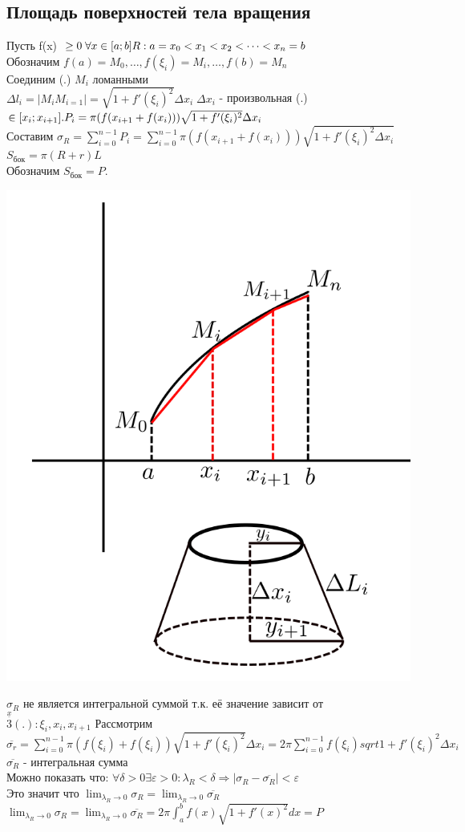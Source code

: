 \documentclass[12pt]{article}
\let\ORIincludegraphics\includegraphics
\renewcommand{\includegraphics}[2][]{\ORIincludegraphics[scale=0.65,#1]{#2}}
\begin{document}
    \subsection{Площадь поверхностей тела вращения}
    Пусть f(x) $\geq 0 \; \forall x \in [a;b]\\
    R:a=x_0<x_1<x_2<\dots<x_n=b$\\
    Обозначим $f(a)=M_0,\dots,f(\xi_i)=M_i,\dots,f(b)=M_n$\\
    Соединим (.) $M_i$ ломанными\\
    $\Delta l_i = |M_iM_{i=1}| = \sqrt{1+f'(\xi_i)^2}\Delta x_i \; \Delta x_i$ - произвольная (.)$\in [x_i;x_{i+1}].
    \\P_i=\pi(f(x_{i+1}+f(x_i)))\sqrt{1+f'(\xi_i)^2}\Delta x_i$\\
    Составим $\sigma_R = \sum_{i=0}^{n-1}P_i=\sum_{i=0}^{n-1}\pi(f(x_{i+1}+f(x_i)))\sqrt{1+f'(\xi_i)^2 \Delta x_i}$
    $S_\text{бок} = \pi (R+r)L$\\
    Обозначим $S_\text{бок} = P$.\\
    \begin{center}
        \includegraphics[width=0.5\linewidth]{6.12.1.png}
    \end{center}
    $\sigma_R$ не является интегральной суммой т.к. её значение зависит от $\overset{\underline{x}}{3} (.): \xi_i,x_i,x_{i+1}$
    Рассмотрим $\overline{\sigma_r} = \sum_{i=0}^{n-1} \pi(f(\xi_i)+f(\xi_i))\sqrt{1+f'(\xi_i)^2}\Delta x_i=2\pi \sum_{i=0}^{n-1}f(\xi_i)sqrt{1+f'(\xi_i)^2}\Delta x_i$\\
    $\overline{\sigma_R}$ - интегральная сумма\\
    Можно показать что: $\forall \delta > 0 \exists \varepsilon > 0: \lambda_R<\delta \Rightarrow |\sigma_R-\overline{\sigma_R}|<\varepsilon$\\
    Это значит что $\lim_{\lambda_R \to 0}\sigma_R=\lim_{\lambda_R \to 0}\overline{\sigma_R}$\\
    $\lim_{\lambda_R \to 0} \sigma_R = \lim_{\lambda_R \to 0} \overline{\sigma_R}=2\pi \int_{a}^{b}f(x)\sqrt{1+f'(x)^2}dx=P$\\
\end{document}

